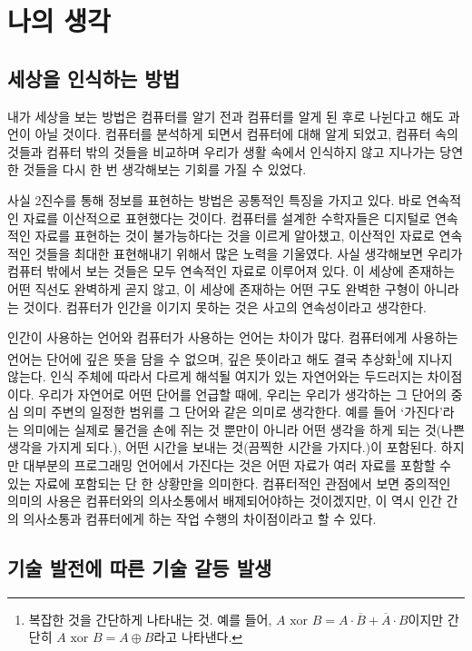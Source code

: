 \documentclass{article}
\begin{document}
\section{나의 생각}

\subsection{세상을 인식하는 방법}

내가 세상을 보는 방법은 컴퓨터를 알기 전과 컴퓨터를 알게 된 후로 나뉜다고 해도 과언이 아닐 것이다.
컴퓨터를 분석하게 되면서 컴퓨터에 대해 알게 되었고, 컴퓨터 속의 것들과 컴퓨터 밖의 것들을 비교하며
우리가 생활 속에서 인식하지 않고 지나가는 당연한 것들을 다시 한 번 생각해보는 기회를 가질 수
있었다.

사실 2진수를 통해 정보를 표현하는 방법은 공통적인 특징을 가지고 있다.
바로 연속적인 자료를 이산적으로 표현했다는 것이다.
컴퓨터를 설계한 수학자들은 디지털로 연속적인 자료를 표현하는 것이 불가능하다는 것을 이르게 알아챘고,
이산적인 자료로 연속적인 것들을 최대한 표현해내기 위해서 많은 노력을 기울였다.
사실 생각해보면 우리가 컴퓨터 밖에서 보는 것들은 모두 연속적인 자료로 이루어져 있다.
이 세상에 존재하는 어떤 직선도 완벽하게 곧지 않고,
이 세상에 존재하는 어떤 구도 완벽한 구형이 아니라는 것이다.
컴퓨터가 인간을 이기지 못하는 것은 사고의 연속성이라고 생각한다.

인간이 사용하는 언어와 컴퓨터가 사용하는 언어는 차이가 많다.
컴퓨터에게 사용하는 언어는 단어에 깊은 뜻을 담을 수 없으며, 깊은 뜻이라고 해도 결국
추상화\footnote{복잡한 것을 간단하게 나타내는 것. 예를 들어,
$A \text{ xor } B = A \cdot \overline B + \overline A \cdot B$이지만
간단히 $A \text{ xor } B = A \oplus B$라고 나타낸다.}에 지나지 않는다.
인식 주체에 따라서 다르게 해석될 여지가 있는 자연어와는 두드러지는 차이점이다.
우리가 자연어로 어떤 단어를 언급할 때에, 우리는 우리가 생각하는 그 단어의 중심 의미 주변의 일정한
범위를 그 단어와 같은 의미로 생각한다. 예를 들어 `가진다'라는 의미에는 실제로 물건을 손에 쥐는 것
뿐만이 아니라 어떤 생각을 하게 되는 것(나쁜 생각을 가지게 되다.),
어떤 시간을 보내는 것(끔찍한 시간을 가지다.)이 포함된다.
하지만 대부분의 프로그래밍 언어에서 가진다는 것은 어떤 자료가 여러 자료를 포함할 수 있는 자료에
포함되는 단 한 상황만을 의미한다.
컴퓨터적인 관점에서 보면 중의적인 의미의 사용은 컴퓨터와의 의사소통에서 배제되어야하는 것이겠지만,
이 역시 인간 간의 의사소통과 컴퓨터에게 하는 작업 수행의 차이점이라고 할 수 있다.

\subsection{기술 발전에 따른 기술 갈등 발생}
\end{document}
